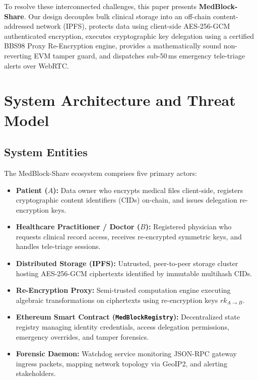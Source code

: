 \documentclass[journal,10pt,twocolumn]{IEEEtran}
\begin{document}
To resolve these interconnected challenges, this paper presents \textbf{MedBlock-Share}. Our design decouples bulk clinical storage into an off-chain content-addressed network (IPFS), protects data using client-side AES-256-GCM authenticated encryption, executes cryptographic key delegation using a certified BBS98 Proxy Re-Encryption engine, provides a mathematically sound non-reverting EVM tamper guard, and dispatches sub-50\,ms emergency tele-triage alerts over WebRTC.

\section{System Architecture and Threat Model}

\subsection{System Entities}
The MedBlock-Share ecosystem comprises five primary actors:
\begin{itemize}
    \item \textbf{Patient ($A$):} Data owner who encrypts medical files client-side, registers cryptographic content identifiers (CIDs) on-chain, and issues delegation re-encryption keys.
    \item \textbf{Healthcare Practitioner / Doctor ($B$):} Registered physician who requests clinical record access, receives re-encrypted symmetric keys, and handles tele-triage sessions.
    \item \textbf{Distributed Storage (IPFS):} Untrusted, peer-to-peer storage cluster hosting AES-256-GCM ciphertexts identified by immutable multihash CIDs.
    \item \textbf{Re-Encryption Proxy:} Semi-trusted computation engine executing algebraic transformations on ciphertexts using re-encryption keys $rk_{A \to B}$.
    \item \textbf{Ethereum Smart Contract (\texttt{MedBlockRegistry}):} Decentralized state registry managing identity credentials, access delegation permissions, emergency overrides, and tamper forensics.
    \item \textbf{Forensic Daemon:} Watchdog service monitoring JSON-RPC gateway ingress packets, mapping network topology via GeoIP2, and alerting stakeholders.
\end{itemize}
\end{document}
